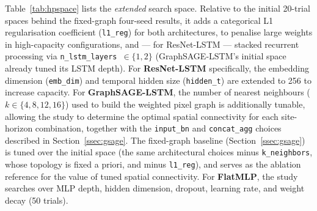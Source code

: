 Table~\ref{tab:hpspace} lists the \emph{extended} search space. Relative to
the initial 20-trial spaces behind the fixed-graph four-seed results, it
adds a categorical L1 regularisation coefficient (\texttt{l1\_reg}) for both
architectures, to penalise large weights in high-capacity configurations,
and --- for ResNet-LSTM --- stacked recurrent processing via
\texttt{n\_lstm\_layers}~$\in\{1,2\}$ (GraphSAGE-LSTM's initial space
already tuned its LSTM depth).
For \textbf{ResNet-LSTM} specifically, the embedding dimension
(\texttt{emb\_dim}) and temporal hidden size (\texttt{hidden\_t}) are extended
to 256 to increase capacity.
For \textbf{GraphSAGE-LSTM}, the number of nearest neighbours
($k \in \{4, 8, 12, 16\}$) used to build the weighted pixel graph is
additionally tunable, allowing the study to determine the optimal spatial
connectivity for each site-horizon combination, together with the
\texttt{input\_bn} and \texttt{concat\_agg} choices described in
Section~\ref{ssec:gsage}. The fixed-graph baseline
(Section~\ref{ssec:gsage}) is tuned over the initial space (the same
architectural choices minus \texttt{k\_neighbors}, whose topology is fixed
a priori, and minus \texttt{l1\_reg}), and serves as the
ablation reference for the value of tuned spatial connectivity.
For \textbf{FlatMLP}, the study searches over MLP depth, hidden dimension,
dropout, learning rate, and weight decay (50 trials).

